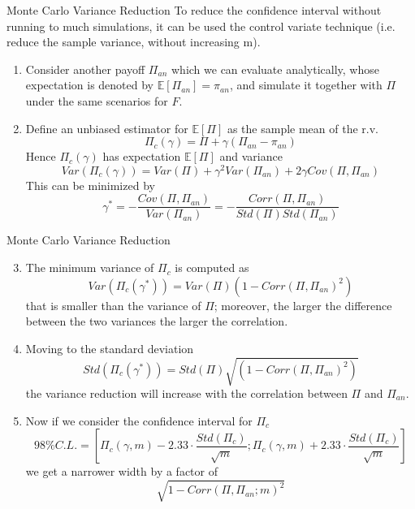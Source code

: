 \documentclass{beamer}
\begin{document}
\begin{frame}{Monte Carlo Variance Reduction}
  To reduce the confidence interval without running to much simulations, it can be used the control variate technique (i.e. reduce the sample variance, without increasing m).
  \begin{enumerate}
  \item Consider another payoff $\Pi_{an}$ which we can evaluate analytically, whose expectation is denoted by $\mathbb{E}[\Pi_{an}] = \pi_{an}$, and simulate it together with $\Pi$ under the same scenarios for $F$.
  \item Define an unbiased estimator for $\mathbb{E}[\Pi]$ as the sample mean of the r.v. 
    \begin{equation*}
      \Pi_c(\gamma) = \Pi + \gamma(\Pi_{an} - \pi_{an})
    \end{equation*}
    Hence $\Pi_c(\gamma)$ has expectation $\mathbb{E}[\Pi]$ and variance
    \begin{equation*}
      Var(\Pi_c(\gamma)) = Var(\Pi) + \gamma^2 Var(\Pi_{an}) + 2\gamma Cov(\Pi, \Pi_{an})
    \end{equation*}
    This can be minimized by 
    \begin{equation*}
      \gamma^* = -\frac{Cov(\Pi, \Pi_{an})}{Var(\Pi_{an})} = -\frac{Corr(\Pi, \Pi_{an})}{Std(\Pi)Std(\Pi_{an})}
    \end{equation*}
  \end{enumerate}
\end{frame}

\begin{frame}{Monte Carlo Variance Reduction}
  \begin{enumerate}
    \setcounter{enumi}{2}
  \item  The minimum variance of $\Pi_c$ is computed as
    \begin{equation*}
      Var(\Pi_c(\gamma^*)) = Var(\Pi) (1 - Corr(\Pi, \Pi_{an})^2)
    \end{equation*}
    that is smaller than the variance of $\Pi$; moreover, the larger the difference between the two variances the larger the correlation.
  \item Moving to the standard deviation
    \begin{equation*}
      Std(\Pi_c(\gamma^*)) = Std(\Pi) \sqrt{(1 - Corr(\Pi, \Pi_{an})^2)}
    \end{equation*}
    the variance reduction will increase with the correlation between $\Pi$ and $\Pi_{an}$. 
  \item Now if we consider the confidence interval for $\Pi_c$ 
    \begin{equation*}
      98\% C.L. =\left[\Pi_c(\gamma,m) - 2.33\cdot\frac{Std(\Pi_c)}{\sqrt{m}};\Pi_c(\gamma,m) + 2.33\cdot\frac{Std(\Pi_c)}{\sqrt{m}}\right] 
    \end{equation*}
    we get a narrower width by a factor of
    \begin{equation*}
      \sqrt{1 - Corr(\Pi, \Pi_{an}; m)^2}
    \end{equation*}
  \end{enumerate}
\end{frame}
\end{document}
